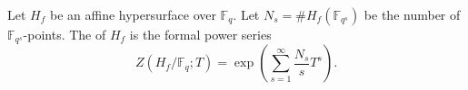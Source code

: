 Let $H_f$ be an affine hypersurface over $\mathbb{F}_q$. Let $N_s = \#H_f(\mathbb{F}_{q^s})$ be the number of $\mathbb{F}_{q^s}$-points. The  of $H_f$ is the formal power series $$Z(H_f/\mathbb{F}_q; T) = \exp\left(\sum_{s=1}^\infty \frac{N_s}{s} T^s\right).$$